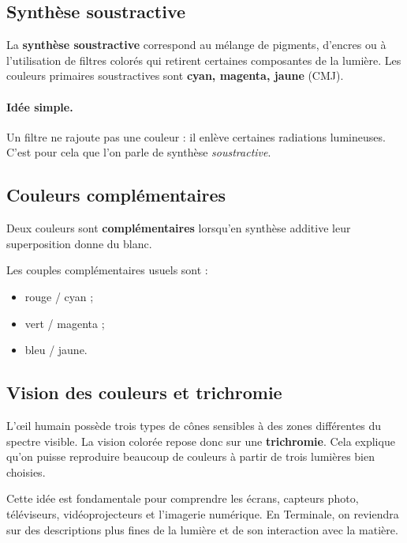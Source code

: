 \documentclass[11pt,a4paper]{article}
\begin{document}
\subsection{Synthèse soustractive}

\begin{definitionbox}
La \textbf{synthèse soustractive} correspond au mélange de pigments, d'encres ou à l'utilisation de filtres colorés qui retirent certaines composantes de la lumière. Les couleurs primaires soustractives sont \textbf{cyan, magenta, jaune} (CMJ).
\end{definitionbox}

\paragraph{Idée simple.}
Un filtre ne \og rajoute \fg{} pas une couleur : il enlève certaines radiations lumineuses. C'est pour cela que l'on parle de synthèse \emph{soustractive}.

\subsection{Couleurs complémentaires}

\begin{definitionbox}
Deux couleurs sont \textbf{complémentaires} lorsqu'en synthèse additive leur superposition donne du blanc.
\end{definitionbox}

\begin{propriete}
Les couples complémentaires usuels sont :
\begin{itemize}
    \item rouge / cyan ;
    \item vert / magenta ;
    \item bleu / jaune.
\end{itemize}
\end{propriete}

\subsection{Vision des couleurs et trichromie}
L'œil humain possède trois types de cônes sensibles à des zones différentes du spectre visible. La vision colorée repose donc sur une \textbf{trichromie}. Cela explique qu'on puisse reproduire beaucoup de couleurs à partir de trois lumières bien choisies.

\begin{ouverture}
Cette idée est fondamentale pour comprendre les écrans, capteurs photo, téléviseurs, vidéoprojecteurs et l'imagerie numérique. En Terminale, on reviendra sur des descriptions plus fines de la lumière et de son interaction avec la matière.
\end{ouverture}
\end{document}

